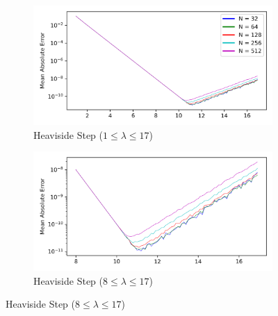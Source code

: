\documentclass[a4paper]{report}
\begin{document}
\begin{figure}[H]
    \begin{subfigure}{.5\linewidth}
      \includegraphics[width=\linewidth]{images/abate_whitt/heaviside.png}
      \caption{Heaviside Step ($1 \leq \lambda \leq 17$)}
    \end{subfigure}\hfill
    \begin{subfigure}{.5\linewidth}
      \includegraphics[width=\linewidth]{images/abate_whitt/heaviside_zoomed.png}
      \caption{Heaviside Step ($8 \leq \lambda \leq 17$)}
    \end{subfigure}
    
    \medskip
    

\end{figure}
\end{document}
